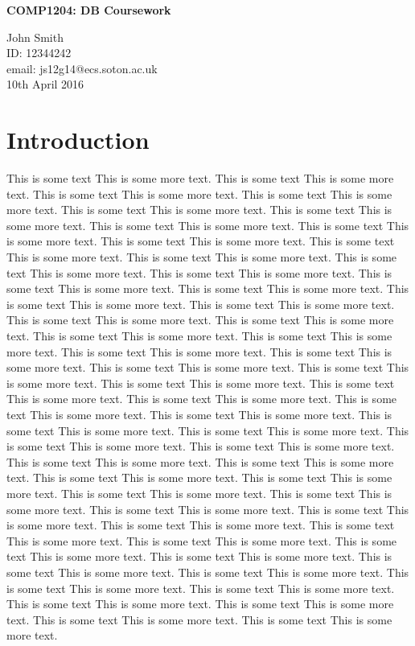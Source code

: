 \documentclass[11pt,epsfig]{article}
\begin{document}

\centerline{\Large \bf COMP1204: DB Coursework}        
\vfill 
   
John Smith \\                             %
ID: 12344242\\				%
email: js12g14@ecs.soton.ac.uk \\ %
10th April 2016 \hfill                             %

\section{Introduction}
This is some text This is some more text. This is some text This is some more text. This is some text This is some more text. This is some text This is some more text. This is some text This is some more text. This is some text This is some more text. This is some text This is some more text. This is some text This is some more text. This is some text This is some more text. This is some text This is some more text. This is some text This is some more text. This is some text This is some more text. This is some text This is some more text. This is some text This is some more text. This is some text This is some more text. This is some text This is some more text. This is some text This is some more text. This is some text This is some more text. This is some text This is some more text. This is some text This is some more text. This is some text This is some more text. This is some text This is some more text. This is some text This is some more text. This is some text This is some more text. This is some text This is some more text. This is some text This is some more text. This is some text This is some more text. This is some text This is some more text. This is some text This is some more text. This is some text This is some more text. This is some text This is some more text. This is some text This is some more text. This is some text This is some more text. This is some text This is some more text. This is some text This is some more text. This is some text This is some more text. This is some text This is some more text. This is some text This is some more text. This is some text This is some more text. This is some text This is some more text. This is some text This is some more text. This is some text This is some more text. This is some text This is some more text. This is some text This is some more text. This is some text This is some more text. This is some text This is some more text. This is some text This is some more text. This is some text This is some more text. This is some text This is some more text. This is some text This is some more text. This is some text This is some more text. This is some text This is some more text. This is some text This is some more text. This is some text This is some more text. This is some text This is some more text. 
\end{document}
